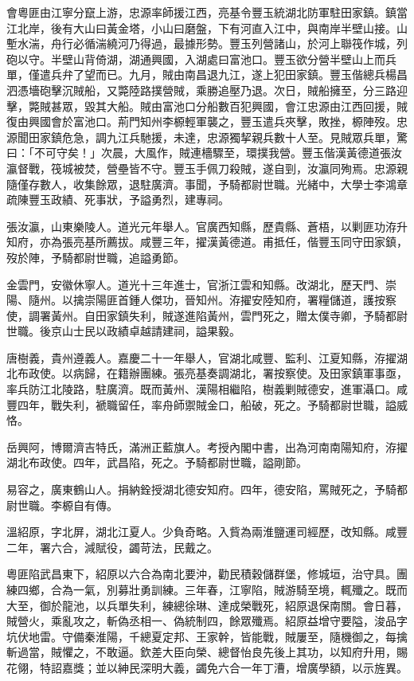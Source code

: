 \begin{pinyinscope}
會粵匪由江寧分竄上游，忠源率師援江西，亮基令豐玉統湖北防軍駐田家鎮。鎮當江北岸，後有大山曰黃金塔，小山曰磨盤，下有河直入江中，與南岸半壁山接。山塹水湍，舟行必循湍繞河乃得過，最據形勢。豐玉列營諸山，於河上聯筏作城，列砲以守。半壁山背倚湖，湖通興國，入湖處曰富池口。豐玉欲分營半壁山上而兵單，僅遣兵弁了望而已。九月，賊由南昌退九江，遂上犯田家鎮。豐玉偕總兵楊昌泗憑墻砲擊沉賊船，又斃陸路撲營賊，乘勝追壓乃退。次日，賊船擁至，分三路迎擊，斃賊甚眾，毀其大船。賊由富池口分船數百犯興國，會江忠源由江西回援，賊復由興國會於富池口。荊門知州李榞輕軍襲之，豐玉遣兵夾擊，敗挫，榞陣歿。忠源聞田家鎮危急，調九江兵馳援，未達，忠源獨挈親兵數十人至。見賊眾兵單，驚曰：「不可守矣！」次晨，大風作，賊連檣驟至，環撲我營。豐玉偕漢黃德道張汝瀛督戰，筏城被焚，營壘皆不守。豐玉手佩刀殺賊，遂自剄，汝瀛同殉焉。忠源親隨僅存數人，收集餘眾，退駐廣濟。事聞，予騎都尉世職。光緒中，大學士李鴻章疏陳豐玉政績、死事狀，予謚勇烈，建專祠。

張汝瀛，山東樂陵人。道光元年舉人。官廣西知縣，歷貴縣、蒼梧，以剿匪功洊升知府，亦為張亮基所薦拔。咸豐三年，擢漢黃德道。甫抵任，偕豐玉同守田家鎮，歿於陣，予騎都尉世職，追謚勇節。

金雲門，安徽休寧人。道光十三年進士，官浙江雲和知縣。改湖北，歷天門、崇陽、隨州。以擒崇陽匪首鍾人傑功，晉知州。洊擢安陸知府，署糧儲道，護按察使，調署黃州。自田家鎮失利，賊遂進陷黃州，雲門死之，贈太僕寺卿，予騎都尉世職。後京山士民以政績卓越請建祠，謚果毅。

唐樹義，貴州遵義人。嘉慶二十一年舉人，官湖北咸豐、監利、江夏知縣，洊擢湖北布政使。以病歸，在籍辦團練。張亮基奏調湖北，署按察使。及田家鎮軍事亟，率兵防江北陵路，駐廣濟。既而黃州、漢陽相繼陷，樹義剿賊德安，進軍灄口。咸豐四年，戰失利，褫職留任，率舟師禦賊金口，船破，死之。予騎都尉世職，謚威恪。

岳興阿，博爾濟吉特氏，滿洲正藍旗人。考授內閣中書，出為河南南陽知府，洊擢湖北布政使。四年，武昌陷，死之。予騎都尉世職，謚剛節。

易容之，廣東鶴山人。捐納銓授湖北德安知府。四年，德安陷，罵賊死之，予騎都尉世職。李榞自有傳。

溫紹原，字北屏，湖北江夏人。少負奇略。入貲為兩淮鹽運司經歷，改知縣。咸豐二年，署六合，減賦役，蠲苛法，民戴之。

粵匪陷武昌東下，紹原以六合為南北要沖，勸民積穀儲群堡，修城垣，治守具。團練四鄉，合為一氣，別募壯勇訓練。三年春，江寧陷，賊游騎至境，輒殲之。既而大至，御於龍池，以兵單失利，練總徐琳、達成榮戰死，紹原退保南關。會日暮，賊營火，乘亂攻之，斬偽丞相一、偽統制四，餘眾殲焉。紹原益增守要隘，浚品字坑伏地雷。守備秦淮陽，千總夏定邦、王家幹，皆能戰，賊屢至，隨機御之，每擒斬過當，賊懼之，不敢逼。欽差大臣向榮、總督怡良先後上其功，以知府升用，賜花翎，特詔嘉獎；並以紳民深明大義，蠲免六合一年丁漕，增廣學額，以示旌異。


\end{pinyinscope}
